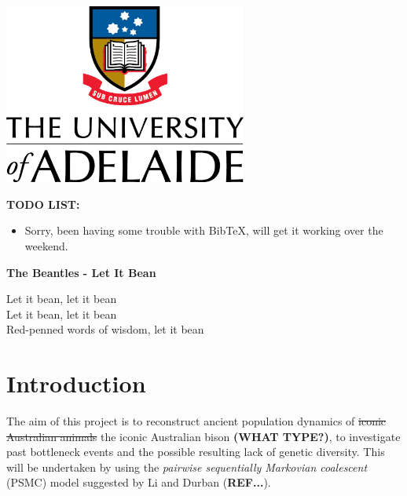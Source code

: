\documentclass[12pt]{article}
\begin{document}
\begin{titlepage}
	\includegraphics[width=0.6\textwidth]{figures/UoA_logo}\\[1.5cm]
	\vfill %
	
\end{titlepage}

\thispagestyle{plain}


\newpage

\tableofcontents
\listofalgorithms
\listoffigures
\listoftables
\newpage


\textbf{TODO LIST:}
\begin{itemize}
\item Sorry, been having some trouble with BibTeX, will get it working over the weekend.
  \end{itemize}


  \begin{center}
  \textbf{The Beantles - Let It Bean}

Let it bean, let it bean\\
Let it bean, let it bean\\
Red-penned words of wisdom, let it bean
\end{center}

%

\section{Introduction}\label{sec:intro}
The aim of this project is to reconstruct ancient population dynamics of \sout{iconic Australian animals} the iconic Australian bison \textbf{(WHAT TYPE?)}, to investigate past bottleneck events and the possible resulting lack of genetic diversity. This will be undertaken by using the \emph{pairwise sequentially Markovian coalescent} (PSMC) model suggested by Li and Durban (\textbf{REF...}).
\end{document}
